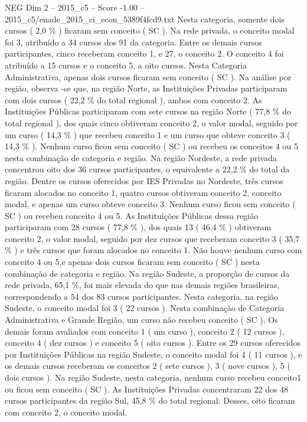 \begin{textsample}{NEG Dim 2 – 2015\_c5 – Score -1.00 – 2015\_c5/enade\_2015\_ci\_econ\_5389f4fcd9.txt}
Nesta categoria, somente dois cursos ( 2,0 \% ) ficaram sem conceito ( SC ).
Na rede privada, o conceito modal foi 3, atribuído a 34 cursos dos 91 da categoria.
Entre os demais cursos participantes, cinco receberam conceito 1, e 27, o conceito 2.
O conceito 4 foi atribuído a 15 cursos e o conceito 5, a oito cursos.
Nesta Categoria Administrativa, apenas dois cursos ficaram sem conceito ( SC ).
Na análise por região, observa -se que, na região Norte, as Instituições Privadas participaram com dois cursos ( 22,2 \% do total regional ), ambos com conceito 2.
As Instituições Públicas participaram com sete cursos na região Norte ( 77,8 \% do total regional ), dos quais cinco obtiveram conceito 2, o valor modal, seguido por um curso ( 14,3 \% ) que recebeu conceito 1 e um curso que obteve conceito 3 ( 14,3 \% ).
Nenhum curso ficou sem conceito ( SC ) ou recebeu os conceitos 4 ou 5 nesta combinação de categoria e região.
Na região Nordeste, a rede privada concentrou oito dos 36 cursos participantes, o equivalente a 22,2 \% do total da região.
Dentre os cursos oferecidos por IES Privadas no Nordeste, três cursos ficaram alocados no conceito 1, quatro cursos obtiveram conceito 2, conceito modal, e apenas um curso obteve conceito 3.
Nenhum curso ficou sem conceito ( SC ) ou recebeu conceito 4 ou 5.
As Instituições Públicas dessa região participaram com 28 cursos ( 77,8 \% ), dos quais 13 ( 46,4 \% ) obtiveram conceito 2, o valor modal, seguido por dez cursos que receberam conceito 3 ( 35,7 \% ) e três cursos que foram alocados no conceito 1.
Não houve nenhum curso com conceito 4 ou 5,e apenas dois cursos ficaram sem conceito ( SC ) nesta combinação de categoria e região.
Na região Sudeste, a proporção de cursos da rede privada, 65,1 \%, foi mais elevada do que nas demais regiões brasileiras, correspondendo a 54 dos 83 cursos participantes.
Nesta categoria, na região Sudeste, o conceito modal foi 3 ( 22 cursos ).
Nesta combinação de Categoria Administrativa e Grande Região, um curso não recebeu conceito ( SC ).
Os demais foram avaliados com conceito 1 ( um curso ), conceito 2 ( 12 cursos ), conceito 4 ( dez cursos ) e conceito 5 ( oito cursos ).
Entre os 29 cursos oferecidos por Instituições Públicas na região Sudeste, o conceito modal foi 4 ( 11 cursos ), e os demais cursos receberam os conceitos 2 ( sete cursos ), 3 ( nove cursos ), 5 ( dois cursos ).
Na região Sudeste, nesta categoria, nenhum curso recebeu conceito1 ou ficou sem conceito ( SC ).
As Instituições Privadas concentraram 22 dos 48 cursos participantes da região Sul, 45,8 \% do total regional.
Desses, oito ficaram com conceito 2, o conceito modal.

\end{textsample}
